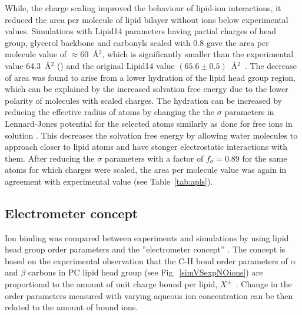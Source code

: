 \documentclass[aip,jcp,twocolumn]{revtex4}
\begin{document}
While, the charge scaling improved the behaviour of lipid-ion interactions,
it reduced the area per molecule of lipid bilayer without ions below experimental
values. Simulations with Lipid14 parameters having partial charges of head group, glycerol
backbone and carbonyls scaled with 0.8 gave the area per molecule value of $\approx$60~\AA$^2$,
which is significantly smaller than the experimental value 64.3~\AA$^2$ (\cite{})
and the original Lipid14 value $(65.6 \pm 0.5)$~\AA$^2$~\cite{dickson14}.
The decrease of area was found to arise from a lower hydration of the lipid head group region,
which can be explained by the increased solvation free energy due to the lower polarity
of molecules with scaled charges. The hydration can be increased
by reducing the effective radius of atoms by changing the 
the $\sigma$ parameters in Lennard-Jones potential for the selected atoms
similarly as done for free ions in solution \cite{kohagen14,kohagen16,Pluharova2014}.
This decreases the solvation free energy by allowing water molecules to
approach closer to lipid atoms and have stonger electrostatic interactions with them.
After reducing the $\sigma$ parameters with a factor of $f_\sigma = 0.89$
for the same atoms for which charges were scaled, the area per molecule value was
again in agreement with experimental value (see Table~\ref{tab:apls}). 


\subsection{Electrometer concept} \label{section:electrometer}
Ion binding was compared between experiments and simulations by 
using lipid head group order parameters and the
''electrometer concept'' \cite{seelig87,catte16}.
The concept is based on the experimental observation that the C-H bond
order parameters of $\alpha$ and $\beta$ carbons in PC lipid head group
(see Fig.~\ref{simVSexpNOions}) are proportional to the amount 
of unit charge bound per lipid,  $X^\pm$~\cite{seelig87}.
Change in the order parameters measured with varying aqueous
ion concentration can be then related to the amount of bound ions.
\end{document}
